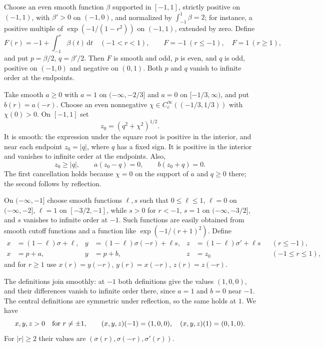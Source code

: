 Choose an even smooth function $\beta$ supported in $[-1,1]$, strictly positive on $(-1,1)$, with $\beta'>0$ on $(-1,0)$, and normalized by $\int_{-1}^1\beta=2$; for instance, a positive multiple of $\exp(-1/(1-r^2))$ on $(-1,1)$, extended by zero. Define
\[
 F(r)=-1+\int_{-1}^r\beta(t)\,\mathrm{d}t\quad(-1<r<1),
 \qquad F=-1\ (r\leq-1),\quad F=1\ (r\geq1),
\]
and put $p=\beta/2$, $q=\beta'/2$. Then $F$ is smooth and odd, $p$ is even, and $q$ is odd, positive on $(-1,0)$ and negative on $(0,1)$. Both $p$ and $q$ vanish to infinite order at the endpoints.

Take smooth $a\geq0$ with $a=1$ on $(-\infty,-2/3]$ and $a=0$ on $[-1/3,\infty)$, and put $b(r)=a(-r)$. Choose an even nonnegative $\chi\in C_c^\infty((-1/3,1/3))$ with $\chi(0)>0$. On $[-1,1]$ set
\[
 z_0=(q^2+\chi^2)^{1/2}.
\]
It is smooth: the expression under the square root is positive in the interior, and near each endpoint $z_0=|q|$, where $q$ has a fixed sign. It is positive in the interior and vanishes to infinite order at the endpoints. Also,
\begin{equation}\label{eq:numa-coefficient-cancellation}
 z_0\geq|q|,\qquad a(z_0-q)=0,\qquad b(z_0+q)=0.
\end{equation}
The first cancellation holds because $\chi=0$ on the support of $a$ and $q\geq0$ there; the second follows by reflection.

On $(-\infty,-1]$ choose smooth functions $\ell,s$ such that $0\leq\ell\leq1$, $\ell=0$ on $(-\infty,-2]$, $\ell=1$ on $[-3/2,-1]$, while $s>0$ for $r<-1$, $s=1$ on $(-\infty,-3/2]$, and $s$ vanishes to infinite order at $-1$. Such functions are easily obtained from smooth cutoff functions and a function like $\exp(-1/(r+1)^2)$. Define
\[
 \begin{aligned}
 x&=(1-\ell)\sigma+\ell,&
 y&=(1-\ell)\sigma(-r)+\ell s,&
 z&=(1-\ell)\sigma'+\ell s &&(r\leq-1),\\
 x&=p+a,& y&=p+b,& z&=z_0 &&(-1\leq r\leq1),
 \end{aligned}
\]
and for $r\geq1$ use $x(r)=y(-r)$, $y(r)=x(-r)$, $z(r)=z(-r)$.

The definitions join smoothly: at $-1$ both definitions give the values $(1,0,0)$, and their differences vanish to infinite order there, since $a=1$ and $b=0$ near $-1$. The central definitions are symmetric under reflection, so the same holds at $1$. We have
\[
 x,y,z>0\quad\hbox{for }r\ne\pm1,\qquad
 (x,y,z)(-1)=(1,0,0),\quad (x,y,z)(1)=(0,1,0).
\]
For $|r|\geq2$ their values are $(\sigma(r),\sigma(-r),\sigma'(r))$.

